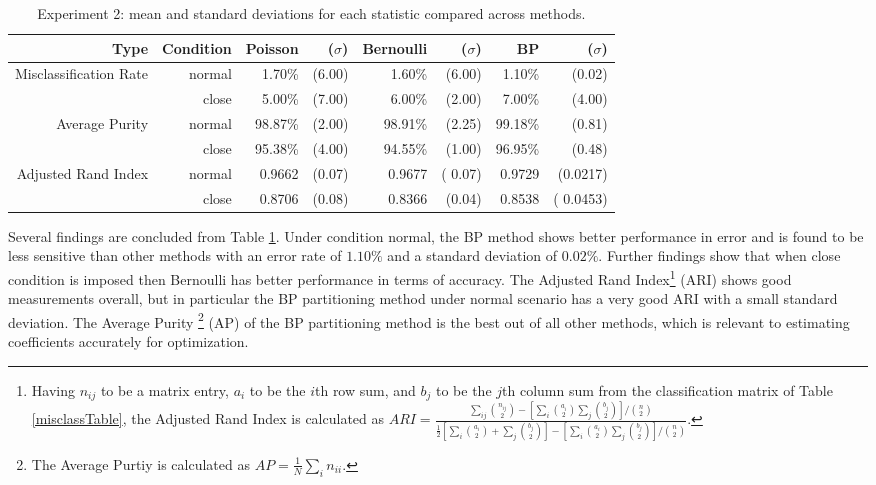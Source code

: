 \documentclass[11pt,letterpaper]{article}
\numberwithin{equation}{section}
\numberwithin{equation}{section}
\numberwithin{equation}{section}
\begin{document}
\begin{table}[!htb]
\begin{center}
\caption{Experiment 2: mean and standard deviations for each statistic compared across methods.}
\label{table:exper2}
\begin{tabular}{rrrrrrrr}
\hline\hline
Type   & Condition & Poisson & ($\sigma $) & Bernoulli & ($ \sigma $) & BP & ($ \sigma $) \\
\hline
Misclassification Rate& normal        & 1.70\% & (6.00)       & 1.60\%  & (6.00)         & 1.10\% & (0.02)         \\
       & close      & 5.00\% & (7.00)       & 6.00\% & (2.00)         & 7.00\% & (4.00)         \\
Average Purity & normal     & 98.87\% & (2.00)    & 98.91\% & (2.25)      & 99.18\% & (0.81)     \\
       & close       & 95.38\% & (4.00)    & 94.55\% & (1.00)      & 96.95\% & (0.48)      \\
Adjusted Rand Index  & normal      & 0.9662 & (0.07)    & 0.9677  & ( 0.07)     & 0.9729 & (0.0217)      \\
       & close         & 0.8706 & (0.08)    & 0.8366 & (0.04)      & 0.8538 & ( 0.0453) \\
       \hline\hline
\end{tabular}
\end{center}
\end{table}
Several findings are concluded from Table \ref{table:exper2}. Under condition normal, the BP method shows better performance in error and is found to be less sensitive than other methods with an error rate of $ 1.10 \% $ and a standard deviation of $ 0.02 \% $.  Further findings show that when close condition is imposed then Bernoulli has better performance in terms of accuracy. The Adjusted Rand Index\footnote{Having $n_{ij}$ to be a matrix entry, $a_i$ to be the $i$th row sum, and $b_j$ to be the $j$th column sum  from the classification matrix of Table \ref{misclassTable}, the Adjusted Rand Index is calculated as  $ARI = \frac{ \sum_{ij} \binom{n_{ij}}{2} - [\sum_i \binom{a_i}{2} \sum_j \binom{b_j}{2}] / \binom{n}{2} }{ \frac{1}{2} [\sum_i \binom{a_i}{2} + \sum_j \binom{b_j}{2}] - [\sum_i \binom{a_i}{2} \sum_j \binom{b_j}{2}] / \binom{n}{2} }$. } (ARI) shows good measurements overall, but in particular the BP partitioning method under normal scenario has a very good ARI with a small standard deviation. The Average Purity \footnote{ The Average Purtiy is calculated as $AP = \frac{1}{N} \sum_i  n_{i i}.$} (AP) of the BP partitioning method is the best out of all other methods, which is relevant to estimating coefficients accurately for optimization.
\end{document}

